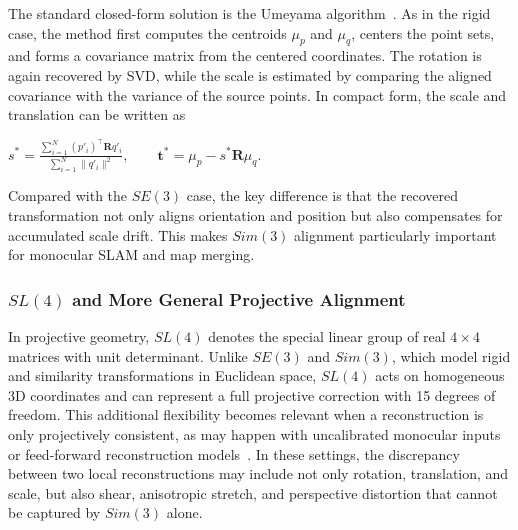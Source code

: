 The standard closed-form solution is the Umeyama algorithm~\cite{umeyama1991least}. As in the rigid case, the method first computes the centroids $\mu_p$ and $\mu_q$, centers the point sets, and forms a covariance matrix from the centered coordinates. The rotation is again recovered by SVD, while the scale is estimated by comparing the aligned covariance with the variance of the source points. In compact form, the scale and translation can be written as
\begin{center}
    $\displaystyle s^* = \frac{\sum_{i=1}^{N} (p'_i)^\top \mathbf{R} q'_i}{\sum_{i=1}^{N}\|q'_i\|^2},\qquad \mathbf{t}^* = \mu_p - s^*\mathbf{R}\mu_q.$
\end{center}
Compared with the $SE(3)$ case, the key difference is that the recovered transformation not only aligns orientation and position but also compensates for accumulated scale drift. This makes $Sim(3)$ alignment particularly important for monocular SLAM and map merging.

\subsubsection*{\boldmath$SL(4)$ and More General Projective Alignment}
In projective geometry, $SL(4)$ denotes the special linear group of real $4\times 4$ matrices with unit determinant. Unlike $SE(3)$ and $Sim(3)$, which model rigid and similarity transformations in Euclidean space, $SL(4)$ acts on homogeneous 3D coordinates and can represent a full projective correction with 15 degrees of freedom. This additional flexibility becomes relevant when a reconstruction is only projectively consistent, as may happen with uncalibrated monocular inputs or feed-forward reconstruction models~\cite{wang2025vggt,maggio2025vggtslam}. In these settings, the discrepancy between two local reconstructions may include not only rotation, translation, and scale, but also shear, anisotropic stretch, and perspective distortion that cannot be captured by $Sim(3)$ alone.

